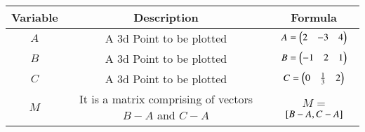 \begin{center}
    \begin{tabular}{|c|c|c|} 
        \hline
            \textbf{Variable} & \textbf{Description} & \textbf{Formula} \\ 
        \hline
            $A$   & A 3d Point to be plotted & $A = \begin{pmatrix}2 & -3 & 4\end{pmatrix}$ \\ 
        \hline
            $B$   &  A 3d Point to be plotted &  $B = \begin{pmatrix}-1 & 2 & 1\end{pmatrix}$\\ 
        \hline
            $C$   & A 3d Point to be plotted & $C  = \begin{pmatrix}0&\frac{1}{3}& 2\end{pmatrix}$\\ 
        \hline
            $M$   & It is a matrix comprising of vectors $B-A$ and $C-A$ & $M$ = \textbf{${}\left[B-A,C-A\right]$}\\ 
        \hline
    \end{tabular}
\end{center}  



